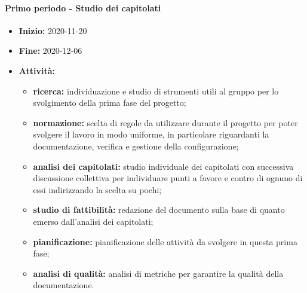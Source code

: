 \paragraph[Primo periodo]{Primo periodo - \textnormal{Studio dei capitolati}}
\begin{itemize}
    \item [] \textbf{Inizio:} 2020-11-20
    \item [] \textbf{Fine:} 2020-12-06
    \item [] \textbf{Attività:}
          \begin{itemize}
              \item \textbf{ricerca:} individuazione e studio di strumenti utili al gruppo per lo svolgimento della prima fase del progetto;
              \item \textbf{normazione:} scelta di regole da utilizzare durante il progetto per poter svolgere il lavoro in modo uniforme, in particolare riguardanti la documentazione, verifica e gestione della configurazione;
              \item \textbf{analisi dei capitolati:} studio individuale dei capitolati con successiva discussione collettiva per individuare punti a favore e contro di ognuno di essi indirizzando la scelta su pochi;
              \item \textbf{studio di fattibilità:} redazione del documento sulla base di quanto emerso dall'analisi dei capitolati;
              \item \textbf{pianificazione:} pianificazione delle attività da svolgere in questa prima fase;
              \item \textbf{analisi di qualità:} analisi di metriche per garantire la qualità della documentazione.
          \end{itemize}
\end{itemize}

